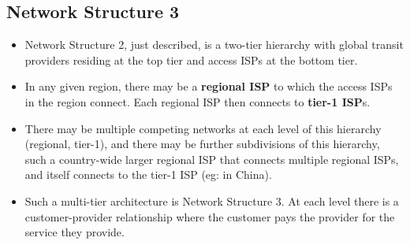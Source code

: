 \documentclass{article}
\theoremstyle{plain}
\theoremstyle{definition}
\begin{document}
\subsection{Network Structure 3}
\begin{itemize}
    \item Network Structure 2, just described, is a two-tier hierarchy with global transit providers residing at the top tier and access ISPs at the bottom tier. 

    \item In any given region, there may be a \textbf{regional ISP} to which the access ISPs in the region connect. Each regional ISP then connects to \textbf{tier-1 ISP}s.
    
    \item There may be multiple competing networks at each level of this hierarchy (regional, tier-1), and there may be further subdivisions of this hierarchy, such a country-wide larger regional ISP that connects multiple regional ISPs, and itself connects to the tier-1 ISP (eg: in China). 
    
    \item Such a multi-tier architecture is Network Structure 3. At each level there is a customer-provider relationship where the customer pays the provider for the service they provide. 
\end{itemize}
\end{document}
